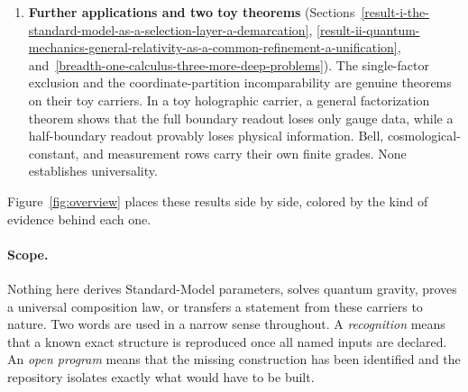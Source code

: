 \begin{enumerate}
  The first asks whether the same min-cut data can hide different geometries. Its graph-level subproblem shows that,
  for nineteen exact equal-cut pairs, the two sets of presentations reachable by forward reduction moves are disjoint.
  Whether they are disjoint under arbitrary moves in both directions remains open. Its state-level subproblem finds six
  exact pairs with identical cut and state data, all of which turn out to be gauge-equivalent tensor networks. The
  second and third programs, on whether gravity must act as a classical record channel and on which invariant
  operators persist as records, remain open. Their finite precursors are, respectively, conditional on an assumed
  channel and sensitive to how records are defined.
\item
  \textbf{Further applications and two toy theorems} (Sections~\ref{result-i-the-standard-model-as-a-selection-layer-a-demarcation},
  \ref{result-ii-quantum-mechanics-general-relativity-as-a-common-refinement-a-unification},
  and~\ref{breadth-one-calculus-three-more-deep-problems}). The single-factor exclusion and the coordinate-partition
  incomparability are genuine theorems on their toy carriers. In a toy holographic carrier, a general factorization
  theorem shows that the full boundary readout loses only gauge data, while a half-boundary readout provably loses
  physical information. Bell, cosmological-constant, and measurement rows carry their own finite grades. None
  establishes universality.
\end{enumerate}

Figure~\ref{fig:overview} places these results side by side, colored by the kind of evidence behind each one.



\paragraph{Scope.} Nothing here derives Standard-Model parameters, solves quantum gravity, proves a universal
composition law, or transfers a statement from these carriers to nature. Two words are used in a narrow sense
throughout. A \emph{recognition} means that a known exact structure is reproduced once all named inputs are declared.
An \emph{open program} means that the missing construction has been identified and the repository isolates exactly
what would have to be built.

